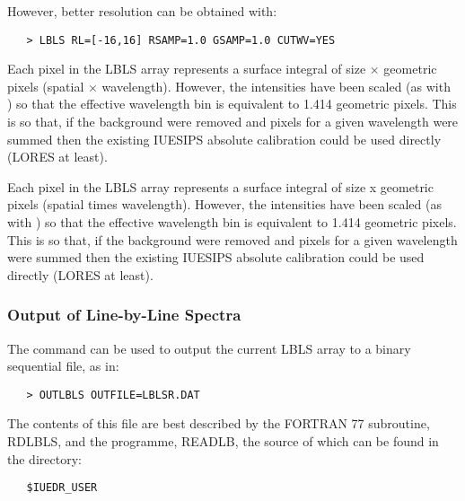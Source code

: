 However, better resolution can be obtained with:

\begin{verbatim}
   > LBLS RL=[-16,16] RSAMP=1.0 GSAMP=1.0 CUTWV=YES
\end{verbatim}

\begin{latexonly}
Each pixel in the LBLS array represents a surface integral of size
 $\times$ 
geometric pixels (spatial $\times$ wavelength)\@.  However, the intensities 
have been scaled (as with ) so that the 
effective wavelength bin is equivalent to 1.414 geometric pixels.
This is so that, if the background were removed and pixels for a given
wavelength were summed then the existing IUESIPS absolute calibration could
be used directly (LORES at least).
\end{latexonly}

\begin{htmlonly}
Each pixel in the LBLS array represents a surface integral of size
x
geometric pixels (spatial times wavelength)\@.  However, the intensities 
have been scaled (as with ) so that the 
effective wavelength bin is equivalent to 1.414 geometric pixels.
This is so that, if the background were removed and pixels for a given
wavelength were summed then the existing IUESIPS absolute calibration could
be used directly (LORES at least).
\end{htmlonly}

\subsubsection{Output of Line-by-Line Spectra}

The 
 command can be used to output the current LBLS array to a
binary sequential file, as in:

\begin{verbatim}
   > OUTLBLS OUTFILE=LBLSR.DAT
\end{verbatim}

The contents of this file are best described by the FORTRAN 77 subroutine,
RDLBLS, and the programme, READLB, the source of which can be found in the
directory:

\begin{verbatim}
   $IUEDR_USER
\end{verbatim}

